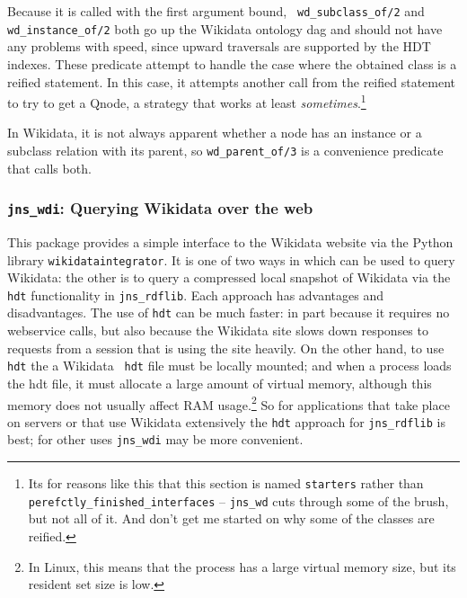 \begin{description}
%
Because it is called with the first argument bound, {\tt
  wd\_subclass\_of/2} and {\tt wd\_instance\_of/2} both go up the
Wikidata ontology dag and should not have any problems with speed,
since upward traversals are supported by the HDT indexes.  These
predicate attempt to handle the case where the obtained class is a
reified statement.  In this case, it attempts another call from the
reified statement to try to get a Qnode, a strategy that works at
least {\em sometimes}.\footnote{Its for reasons like this that this
section is named {\tt starters} rather than {\tt
  perefctly\_finished\_interfaces} -- {\tt jns\_wd} cuts through some
of the brush, but not all of it.  And don't get me started on why some
of the classes are reified.}

In Wikidata, it is not always apparent whether a node has an instance
or a subclass relation with its parent, so {\tt wd\_parent\_of/3} is a
convenience predicate that calls both.

\end{description}

\subsubsection{{\tt jns\_wdi}: Querying Wikidata over the web}

This package provides a simple interface to the Wikidata website via
the Python library {\tt wikidataintegrator}.  It is one of two ways in
which \janus{} can be used to query Wikidata: the other is to query
a compressed local snapshot of Wikidata via the {\tt hdt}
functionality in {\tt jns\_rdflib}.  Each approach has advantages and
disadvantages.  The use of {\tt hdt} can be much faster: in part
because it requires no webservice calls, but also because the Wikidata
site slows down responses to requests from a session that is using the
site heavily.  On the other hand, to use {\tt hdt} the a Wikidata {\tt
  hdt} file must be locally mounted; and when a process loads the hdt
file, it must allocate a large amount of virtual memory, although this
memory does not usually affect RAM usage.\footnote{In Linux, this
  means that the process has a large virtual memory size, but its
  resident set size is low.}  So for applications that take place on
servers or that use Wikidata extensively the {\tt hdt} approach for
{\tt jns\_rdflib} is best; for other uses {\tt jns\_wdi} may be more
convenient.

